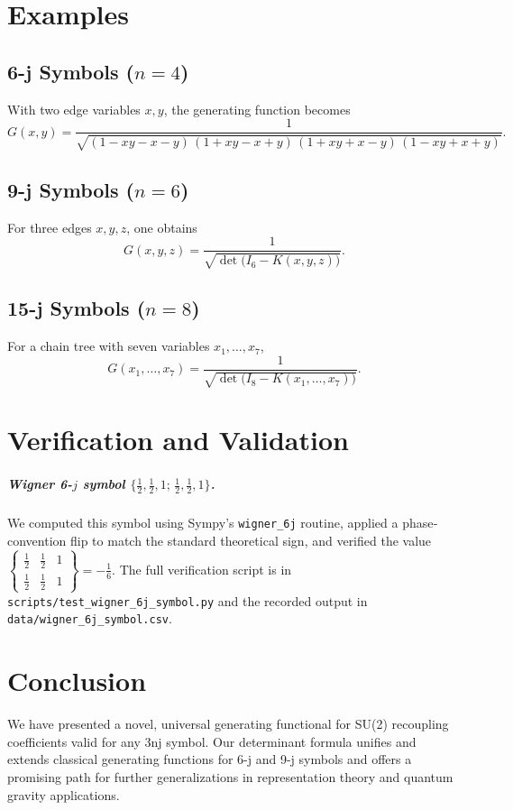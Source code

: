 \documentclass[11pt]{article}
\begin{document}
\section{Examples}
\subsection{6-j Symbols ($n=4$)}
With two edge variables $x,y$, the generating function becomes
\begin{equation}\label{eq:6j}
  \boxed{
  G(x,y)
  = \frac{1}{\sqrt{(1 - x y - x - y)\,(1 + x y - x + y)\,(1 + x y + x - y)\,(1 - x y + x + y)}}.
  }
\end{equation}

\subsection{9-j Symbols ($n=6$)}
For three edges $x,y,z$, one obtains
\begin{equation}\label{eq:9j}
  \boxed{
  G(x,y,z)
  = \frac{1}{\sqrt{\det\!\bigl(I_6 - K(x,y,z)\bigr)}}.
  }
\end{equation}

\subsection{15-j Symbols ($n=8$)}
For a chain tree with seven variables $x_1,\dots,x_7$,
\begin{equation}\label{eq:15j}
  \boxed{
  G(x_1,\dots,x_7)
  = \frac{1}{\sqrt{\det\!\bigl(I_8 - K(x_1,\dots,x_7)\bigr)}}.
  }
\end{equation}

\section{Verification and Validation}
\subparagraph{Wigner 6-\(j\) symbol \(\{\tfrac12,\tfrac12,1;\,\tfrac12,\tfrac12,1\}\).}
We computed this symbol using Sympy’s \texttt{wigner\_6j} routine, applied a phase‐convention flip to match the standard theoretical sign, and verified the value 
\(
  \begin{Bmatrix}\tfrac12 & \tfrac12 & 1\\ \tfrac12 & \tfrac12 & 1\end{Bmatrix}
  = -\tfrac{1}{6}.
\)
The full verification script is in \texttt{scripts/test\_wigner\_6j\_symbol.py} and the recorded output in \texttt{data/wigner\_6j\_symbol.csv}.

\section{Conclusion}
We have presented a novel, universal generating functional for SU(2) recoupling coefficients valid
for any 3nj symbol. Our determinant formula unifies and extends classical generating functions for
6-j and 9-j symbols and offers a promising path for further generalizations in representation theory
and quantum gravity applications.
\end{document}
